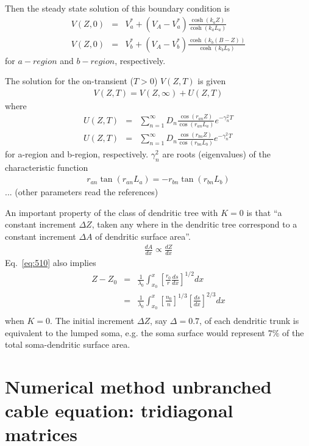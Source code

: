 Then the steady state solution of this boundary condition
is~\cite{rall1962tpp}
\begin{eqnarray}
  \label{eq:527}
  V(Z,0) &=& V_a^* + (V_A-V_a^*) \frac{\cosh(k_aZ)}{\cosh (k_aL_a)} \\
  V(Z,0) &=& V_b^* + (V_A-V_b^*) \frac{\cosh(k_b(B-Z))}{\cosh (k_bL_b)}
\end{eqnarray}
for $a-region$ and $b-region$, respectively.

The solution for the on-transient ($T>0$) $V(Z,T)$ is given
\begin{eqnarray}
  \label{eq:528}
  V(Z,T) = V(Z,\infty) + U(Z,T)
\end{eqnarray}
where
\begin{eqnarray}
  \label{eq:529}
  U(Z,T) &=& \sum_{n=1}^\infty D_n
  \frac{\cos(r_{an}Z)}{\cos(r_{an}L_a)}e^{-\gamma_n^2 T} \\
  U(Z,T) &=& \sum_{n=1}^\infty D_n
  \frac{\cos(r_{bn}Z)}{\cos(r_{bn}L_b)}e^{-\gamma_n^2 T}
\end{eqnarray}
for a-region and b-region, respectively. $\gamma_n^2$ are roots
(eigenvalues) of the characteristic function
\begin{eqnarray}
  \label{eq:530}
  r_{an}\tan(r_{an}L_a) = -r_{bn} \tan (r_{bn}L_b)
\end{eqnarray}
... (other parameters read the references)

An important property of the class of dendritic tree with $K=0$ is
that ``a constant increment $\Delta Z$, taken any where in the
dendritic tree correspond to a constant increment $\Delta A$ of
dendritic surface area''.
\begin{eqnarray}
  \label{eq:518}
  \frac{dA}{dx} \varpropto \frac{dZ}{dx}
\end{eqnarray}
Eq.~\eqref{eq:510} also implies
\begin{eqnarray}
  \label{eq:519}
  Z-Z_0 &=& \frac{1}{\lambda_0} \int_{x_0}^x
  \left[\frac{r_0}{r}\frac{ds}{dx}\right]^{1/2} dx \\
  &=& \frac{1}{\lambda_0} \int_{x_0}^x
  \left[\frac{n_0}{n}\right]^{1/3}\left[\frac{ds}{dx}\right]^{2/3} dx \\
\end{eqnarray}
when $K=0$. The initial increment $\Delta Z$, say $\Delta = 0.7$, of
each dendritic trunk is equivalent to the lumped soma, e.g. the soma
surface would represent $7\%$ of the total soma-dendritic surface
area.




\section{Numerical method unbranched cable equation: tridiagonal matrices}

